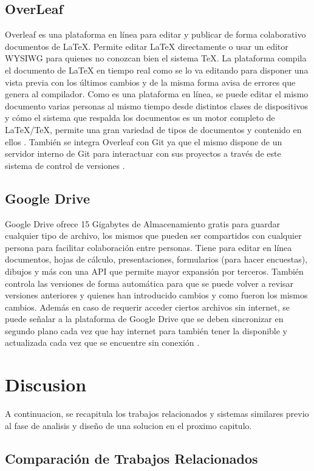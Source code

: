 \subsection{OverLeaf}
Overleaf es una plataforma en línea para editar y publicar de forma colaborativo documentos de LaTeX. Permite editar LaTeX directamente o usar un editor WYSIWG para quienes no conozcan bien el sistema TeX. La plataforma compila el documento de LaTeX en tiempo real como se lo va editando para disponer una vista previa con los últimos cambios y de la misma forma avisa de errores que genera al compilador. Como es una plataforma en línea, se puede editar el mismo documento varias personas al mismo tiempo desde distintos clases de dispositivos y cómo el sistema que respalda los documentos es un motor completo de LaTeX/TeX, permite una gran variedad de tipos de documentos y contenido en ellos \citep{Overleaf}. También se integra Overleaf con Git ya que el mismo dispone de un servidor interno de Git para interactuar con sus proyectos a través de este sistema de control de versiones \citep{Overleaf-Git}.

\subsection{Google Drive}
Google Drive ofrece 15 Gigabytes de Almacenamiento gratis para guardar cualquier tipo de archivo, los mismos que pueden ser compartidos con cualquier persona para facilitar colaboración entre personas. Tiene para editar en línea documentos, hojas de cálculo, presentaciones, formularios (para hacer encuestas), dibujos y más con una API que permite mayor expansión por terceros. También controla las versiones de forma automática para que se puede volver a revisar versiones anteriores y quienes han introducido cambios y como fueron los mismos cambios. Además en caso de requerir acceder ciertos archivos sin internet, se puede señalar a la plataforma de Google Drive que se deben sincronizar en segundo plano cada vez que hay internet para también tener la disponible y actualizada cada vez que se encuentre sin conexión \citep{Google-Drive-Usage}.

\pagebreak
\section{Discusion}
A continuacion, se recapitula los trabajos relacionados y sistemas similares previo al fase de analisis y diseño de una solucion en el proximo capitulo.

\subsection{Comparación de Trabajos Relacionados}

